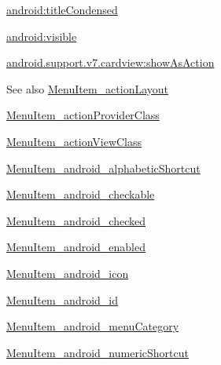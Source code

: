 {\ttfamily \hyperlink{classandroid_1_1support_1_1v7_1_1cardview_1_1R_1_1styleable_a32c62ba80fc355b96520c8ff294be6ea}{android\+:title\+Condensed}}

{\ttfamily \hyperlink{classandroid_1_1support_1_1v7_1_1cardview_1_1R_1_1styleable_a511269a83c8ff86f1563f6ee710e8662}{android\+:visible}}

{\ttfamily \hyperlink{classandroid_1_1support_1_1v7_1_1cardview_1_1R_1_1styleable_a5eae947f3c7e674fa7b5cf9b10a4aac4}{android.\+support.\+v7.\+cardview\+:show\+As\+Action}}

\begin{DoxySeeAlso}{See also}
\hyperlink{classandroid_1_1support_1_1v7_1_1cardview_1_1R_1_1styleable_afc66347211033a94261991c2716632bc}{Menu\+Item\+\_\+action\+Layout} 

\hyperlink{classandroid_1_1support_1_1v7_1_1cardview_1_1R_1_1styleable_a2fcf53a7e48550c4f268ac01853a1655}{Menu\+Item\+\_\+action\+Provider\+Class} 

\hyperlink{classandroid_1_1support_1_1v7_1_1cardview_1_1R_1_1styleable_a68225a0f12a88cf1ba29787d1c3653f7}{Menu\+Item\+\_\+action\+View\+Class} 

\hyperlink{classandroid_1_1support_1_1v7_1_1cardview_1_1R_1_1styleable_a0b91d93cd360e9465c306a85707eb4ac}{Menu\+Item\+\_\+android\+\_\+alphabetic\+Shortcut} 

\hyperlink{classandroid_1_1support_1_1v7_1_1cardview_1_1R_1_1styleable_a1ab1fd5f17ea58611817a12d2ef3713b}{Menu\+Item\+\_\+android\+\_\+checkable} 

\hyperlink{classandroid_1_1support_1_1v7_1_1cardview_1_1R_1_1styleable_a4ffc529c71f2f0638450bac64fa53cfc}{Menu\+Item\+\_\+android\+\_\+checked} 

\hyperlink{classandroid_1_1support_1_1v7_1_1cardview_1_1R_1_1styleable_a74813299c9b7535e4ba2a80e13f710f1}{Menu\+Item\+\_\+android\+\_\+enabled} 

\hyperlink{classandroid_1_1support_1_1v7_1_1cardview_1_1R_1_1styleable_a9a74a73962dfd31a08f9c5012b4a47ad}{Menu\+Item\+\_\+android\+\_\+icon} 

\hyperlink{classandroid_1_1support_1_1v7_1_1cardview_1_1R_1_1styleable_aceedae784a2b71f1563676652a79235d}{Menu\+Item\+\_\+android\+\_\+id} 

\hyperlink{classandroid_1_1support_1_1v7_1_1cardview_1_1R_1_1styleable_ab7b49f654f52bb18770eefb7401b05e6}{Menu\+Item\+\_\+android\+\_\+menu\+Category} 

\hyperlink{classandroid_1_1support_1_1v7_1_1cardview_1_1R_1_1styleable_a52bacfc9a0dce455ac562b26db155cc4}{Menu\+Item\+\_\+android\+\_\+numeric\+Shortcut} 


\end{DoxySeeAlso}
